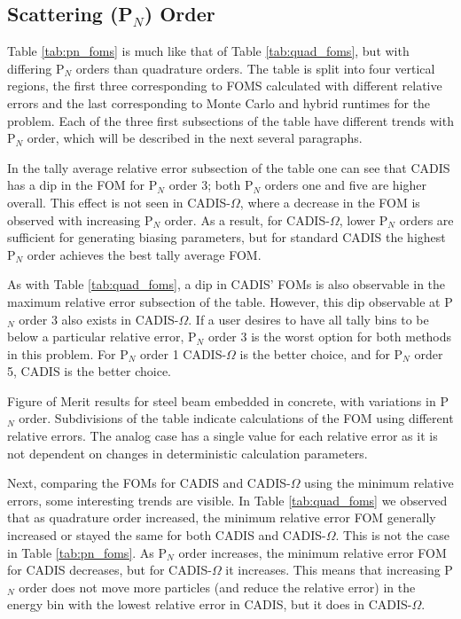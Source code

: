 \subsection{Scattering (P$_N$) Order}
\label{subsec:pnorder}

Table \ref{tab:pn_foms} is much like that of Table \ref{tab:quad_foms}, but with
differing P$_N$ orders than quadrature orders. The table is split into four
vertical regions, the first three corresponding to FOMS calculated with
different relative errors and the last corresponding to Monte Carlo and hybrid
runtimes for the problem. Each of the three first subsections of the table have
different trends with P$_N$ order, which will be described in the next several
paragraphs.

In the tally average relative error subsection of the table one can see that
CADIS has a dip in the FOM for P$_N$ order 3; both P$_N$ orders one and five are
higher overall. This effect is not seen in CADIS-$\Omega$, where a decrease in
the FOM is observed with increasing P$_N$ order. As a result, for
CADIS-$\Omega$, lower P$_N$ orders are sufficient for generating biasing
parameters, but for standard CADIS the highest P$_N$ order achieves the best
tally average FOM.

As with Table \ref{tab:quad_foms}, a dip in CADIS' FOMs is also observable in the
maximum relative error subsection of the table. However, this dip observable at
P$_N$ order 3 also exists in CADIS-$\Omega$. If a user desires to have all
tally bins to be below a particular relative error, P$_N$ order 3 is the worst
option for both methods in this problem. For P$_N$ order 1 CADIS-$\Omega$ is the
better choice, and for P$_N$ order 5, CADIS is the better choice.

\begin{table}[h!]
  \centering
  
  \caption[Figure of Merit results for steel beam embedded in concrete, with
  variations in P$_{N}$ order.]{Figure of Merit results for steel beam embedded in concrete, with
    variations in P$_{N}$ order. Subdivisions of the table indicate
calculations of the FOM using different relative errors. The analog case has a
single value for each relative error as it is not dependent on changes in
deterministic calculation parameters.}
  \label{tab:pn_foms}
\end{table}

Next, comparing the FOMs for CADIS and CADIS-$\Omega$ using the minimum relative
errors, some interesting trends are visible. In Table \ref{tab:quad_foms} we
observed that as quadrature order increased, the minimum relative error FOM
generally increased or stayed the same for both CADIS and
CADIS-$\Omega$. This is not the case in Table \ref{tab:pn_foms}. As P$_N$ order
increases, the minimum relative error FOM for CADIS decreases, but for
CADIS-$\Omega$ it increases. This means that increasing P$_N$ order does not
move more particles (and reduce the relative error) in the energy bin with the
lowest relative error in CADIS, but it does in CADIS-$\Omega$.

